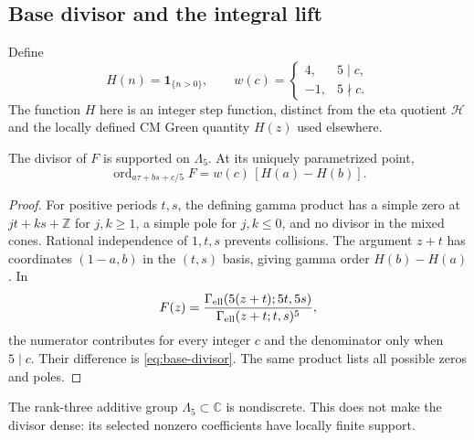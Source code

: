 \subsection{Base divisor and the integral lift}
Define
\[
 H(n)=\mathbf1_{\{n>0\}},\qquad
 w(c)=\begin{cases}4,&5\mid c,\\-1,&5\nmid c.\end{cases}
\]
The function $H$ here is an integer step function, distinct from the eta quotient $\mathcal H$ and the locally defined CM Green quantity $H(z)$ used elsewhere.

\begin{theorem}\label{thm:base-divisor}
The divisor of $F$ is supported on $\Lambda_5$. At its uniquely parametrized point,
\begin{equation}\label{eq:base-divisor}
 \operatorname{ord}_{a\tau+bs+c/5}F=w(c)\,[H(a)-H(b)].
\end{equation}
\end{theorem}
\begin{proof}
For positive periods $t,s$, the defining gamma product has a simple zero at $jt+ks+\mathbb Z$ for $j,k\ge1$, a simple pole for $j,k\le0$, and no divisor in the mixed cones. Rational independence of $1,t,s$ prevents collisions. The argument $z+t$ has coordinates $(1-a,b)$ in the $(t,s)$ basis, giving gamma order $H(b)-H(a)$. In
\[
 F(z)=\frac{\Gamma_{\rm ell}(5(z+t);5t,5s)}
 {\Gamma_{\rm ell}(z+t;t,s)^5},
\]
the numerator contributes for every integer $c$ and the denominator only when $5\mid c$. Their difference is \eqref{eq:base-divisor}. The same product lists all possible zeros and poles.
\end{proof}
The rank-three additive group $\Lambda_5\subset\mathbb C$ is nondiscrete. This does not make the divisor dense: its selected nonzero coefficients have locally finite support.


